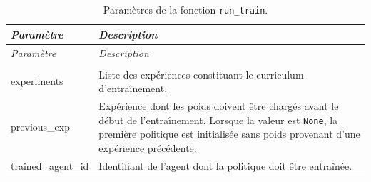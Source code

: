 \begin{longtable}{
        >{\ttfamily\small}p{}
        p{}
    }
    \caption{Paramètres de la fonction \texttt{run\_train}.}
    \label{tab:run_train_parameters}                                                                                                                                                                                                                \\

    \toprule
    \textnormal{\textit{Paramètre}} & \textit{Description}                                                                                                                                                                                          \\
    \midrule
    \endfirsthead

    \toprule
    \textnormal{\textit{Paramètre}} & \textit{Description}                                                                                                                                                                                          \\
    \midrule
    \endhead

    \midrule
    \\
    \endfoot

    \bottomrule
    \endlastfoot

    experiments

                                    & Liste des expériences constituant le curriculum d'entraînement.                                                                                                                                               \\

    previous\_exp

                                    & Expérience dont les poids doivent être chargés avant le début de l'entraînement. Lorsque la valeur est \texttt{None}, la première politique est initialisée sans poids provenant d'une expérience précédente. \\

    trained\_agent\_id

                                    & Identifiant de l'agent dont la politique doit être entraînée.                                                                                                                                                 \\
\end{longtable}

